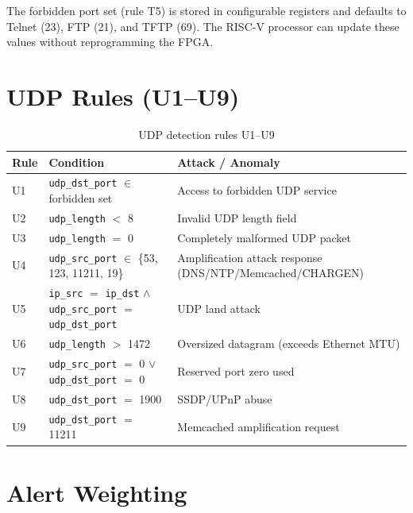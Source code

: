 \documentclass[12pt, a4paper]{report}
\begin{document}
The forbidden port set (rule T5) is stored in configurable registers and defaults to Telnet (23), FTP (21), and TFTP (69). The RISC-V processor can update these values without reprogramming the FPGA.

\section{UDP Rules (U1--U9)}

\begin{table}[H]
\centering
\caption{UDP detection rules U1--U9}
\label{tab:u1u9}
\begin{tabular}{lp{6cm}p{6cm}}
\toprule
\textbf{Rule} & \textbf{Condition} & \textbf{Attack / Anomaly} \\
\midrule
U1 & \texttt{udp\_dst\_port} $\in$ forbidden set & Access to forbidden UDP service \\
U2 & \texttt{udp\_length} $<$ 8 & Invalid UDP length field \\
U3 & \texttt{udp\_length} $=$ 0 & Completely malformed UDP packet \\
U4 & \texttt{udp\_src\_port} $\in$ \{53, 123, 11211, 19\} & Amplification attack response (DNS/NTP/Memcached/CHARGEN) \\
U5 & \texttt{ip\_src} $=$ \texttt{ip\_dst} $\wedge$ \texttt{udp\_src\_port} $=$ \texttt{udp\_dst\_port} & UDP land attack \\
U6 & \texttt{udp\_length} $>$ 1472 & Oversized datagram (exceeds Ethernet MTU) \\
U7 & \texttt{udp\_src\_port} $=$ 0 $\vee$ \texttt{udp\_dst\_port} $=$ 0 & Reserved port zero used \\
U8 & \texttt{udp\_dst\_port} $=$ 1900 & SSDP/UPnP abuse \\
U9 & \texttt{udp\_dst\_port} $=$ 11211 & Memcached amplification request \\
\bottomrule
\end{tabular}
\end{table}
\newpage
\section{Alert Weighting}
\end{document}
